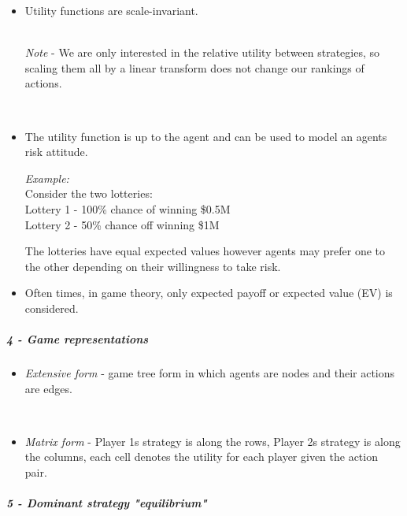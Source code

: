 \documentclass[
]{article}
\providecommand{\tightlist}{%
  \setlength{\itemsep}{0pt}\setlength{\parskip}{0pt}}
\begin{document}
\begin{itemize}
\item
  Utility functions are scale-invariant.\\
  \strut \\
  \emph{Note} - We are only interested in the relative utility between
  strategies, so scaling them all by a linear transform does not change
  our rankings of actions.\\
  \strut \\
\item
  The utility function is up to the agent and can be used to model an
  agent\textquotesingle s risk attitude.

  \emph{Example:}\\
  Consider the two lotteries:\\
  Lottery 1 - 100\% chance of winning \$0.5M\\
  Lottery 2 - 50\% chance off winning \$1M

  The lotteries have equal expected values however agents may prefer one
  to the other depending on their willingness to take risk.
\end{itemize}

\begin{itemize}
\tightlist
\item
  Often times, in game theory, only expected payoff or expected value
  (EV) is considered.
\end{itemize}

\subparagraph{4 - Game representations}\label{game-representations}

\begin{itemize}
\item
  {\emph{Extensive form}} - game tree form in which agents are nodes and
  their actions are edges.\\
  \strut \\
\item
  {\emph{Matrix form}} - Player 1\textquotesingle s strategy is along
  the rows, Player 2\textquotesingle s strategy is along the columns,
  each cell denotes the utility for each player given the action pair.
\end{itemize}

\subparagraph{5 - Dominant strategy
"equilibrium"}\label{dominant-strategy-equilibrium}
\end{document}
